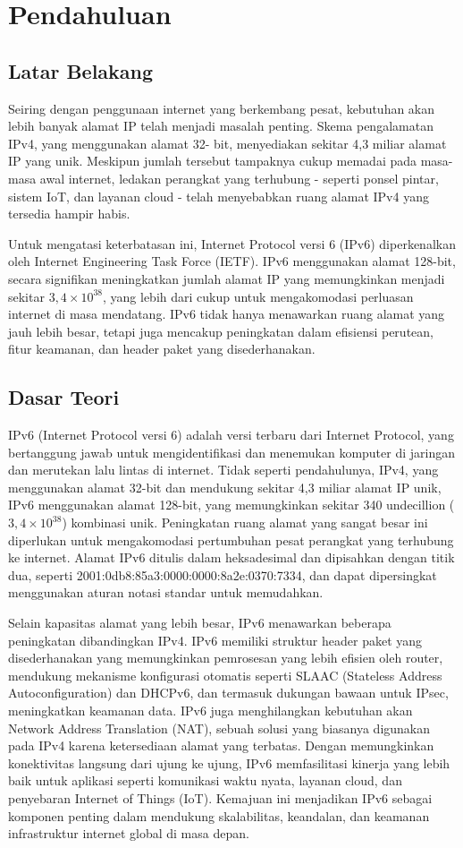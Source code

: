 \section{Pendahuluan}
\subsection{Latar Belakang}
Seiring dengan penggunaan internet yang berkembang pesat, 
kebutuhan akan lebih banyak alamat IP telah menjadi masalah 
penting. Skema pengalamatan IPv4, yang menggunakan alamat 32-
bit, menyediakan sekitar 4,3 miliar alamat IP yang unik. 
Meskipun jumlah tersebut tampaknya cukup memadai pada masa-masa 
awal internet, ledakan perangkat yang terhubung - seperti ponsel 
pintar, sistem IoT, dan layanan cloud - telah menyebabkan ruang 
alamat IPv4 yang tersedia hampir habis.

Untuk mengatasi keterbatasan ini, Internet Protocol versi 6 
(IPv6) diperkenalkan oleh Internet Engineering Task Force (IETF). 
IPv6 menggunakan alamat 128-bit, secara signifikan meningkatkan 
jumlah alamat IP yang memungkinkan menjadi sekitar $3,4\times 10^{38}$, 
yang lebih dari cukup untuk mengakomodasi perluasan internet di 
masa mendatang. IPv6 tidak hanya menawarkan ruang alamat yang 
jauh lebih besar, tetapi juga mencakup peningkatan dalam 
efisiensi perutean, fitur keamanan, dan header paket yang 
disederhanakan.
\subsection{Dasar Teori}
IPv6 (Internet Protocol versi 6) adalah versi terbaru dari 
Internet Protocol, yang bertanggung jawab untuk mengidentifikasi 
dan menemukan komputer di jaringan dan merutekan lalu lintas di 
internet. Tidak seperti pendahulunya, IPv4, yang menggunakan 
alamat 32-bit dan mendukung sekitar 4,3 miliar alamat IP unik, 
IPv6 menggunakan alamat 128-bit, yang memungkinkan sekitar 340 
undecillion ($3,4\times 10^{38}$) kombinasi unik. Peningkatan ruang 
alamat yang sangat besar ini diperlukan untuk mengakomodasi 
pertumbuhan pesat perangkat yang terhubung ke internet. Alamat 
IPv6 ditulis dalam heksadesimal dan dipisahkan dengan titik dua, 
seperti 2001:0db8:85a3:0000:0000:8a2e:0370:7334, dan dapat 
dipersingkat menggunakan aturan notasi standar untuk memudahkan.

Selain kapasitas alamat yang lebih besar, IPv6 menawarkan 
beberapa peningkatan dibandingkan IPv4. IPv6 memiliki struktur 
header paket yang disederhanakan yang memungkinkan pemrosesan 
yang lebih efisien oleh router, mendukung mekanisme konfigurasi 
otomatis seperti SLAAC (Stateless Address Autoconfiguration) dan 
DHCPv6, dan termasuk dukungan bawaan untuk IPsec, meningkatkan 
keamanan data. IPv6 juga menghilangkan kebutuhan akan Network 
Address Translation (NAT), sebuah solusi yang biasanya digunakan 
pada IPv4 karena ketersediaan alamat yang terbatas. Dengan 
memungkinkan konektivitas langsung dari ujung ke ujung, IPv6 
memfasilitasi kinerja yang lebih baik untuk aplikasi seperti 
komunikasi waktu nyata, layanan cloud, dan penyebaran Internet 
of Things (IoT). Kemajuan ini menjadikan IPv6 sebagai komponen 
penting dalam mendukung skalabilitas, keandalan, dan keamanan 
infrastruktur internet global di masa depan.
